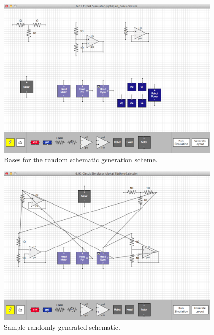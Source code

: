 \begin{figure}[H]
\begin{center}
\includegraphics[width=\textwidth]{Images/auto_generation_bases.png}
\caption[Random schematic generation bases]{Bases for the random schematic
generation scheme.}
\label{fig:random_gen_bases}
\end{center}
\end{figure}

\begin{figure}[H]
\begin{center}
\includegraphics[width=\textwidth]{Images/auto_generation_example.png}
\caption[Sample randomly generated schematic]{Sample randomly generated
schematic.}
\label{fig:example_random_schematic}
\end{center}
\end{figure}

